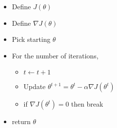 \documentclass[10pt]{article}
\begin{document}
\begin{itemize}[itemsep=0mm]
  \setlength\itemsep{0em}
  \item Define $J(\theta)$
  \item Define $\nabla J(\theta)$
  \item Pick starting $\theta$
  \item For the number of iterations,
  \vspace{-2mm}
  \begin{itemize}[itemsep=0mm]
    \setlength\itemsep{0em}
    \item $t \leftarrow t+1$
    \item Update $\theta^{t+1} = \theta^t - \alpha \nabla J(\theta^t)$
    \item if $\nabla J(\theta^t) = 0$ then break
  \end{itemize}
  \item return $\theta$
\end{itemize}
\end{document}
